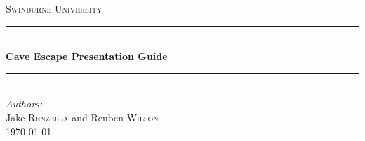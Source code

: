 \documentclass[12pt]{article}
\begin{document}
\begin{titlepage}

\newcommand{\HRule}{\rule{\linewidth}{0.5mm}} %

\center %

\textsc{\LARGE Swinburne University}\\[1.5cm] %

\HRule \\[0.4cm]
{ \huge \bfseries Cave Escape Presentation Guide}\\[0.4cm] %
\HRule \\[1.5cm]

\Large \emph{Authors:}\\
Jake \textsc{Renzella} and Reuben \textsc{Wilson}\\[3cm] %

{\large \today}\\[3cm] %




\vfill %

\end{titlepage}
\end{document}
